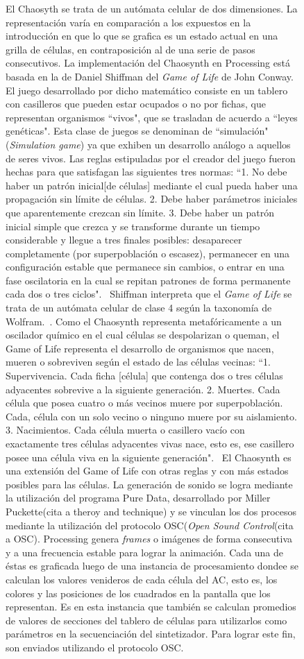 \documentclass[16pt,spanish]{article}
\begin{document}
\begin{figure}[h!]
	El Chaosyth se trata de un autómata celular de dos dimensiones. La representación varía en comparación a los expuestos en la introducción en que lo que se grafica es un estado actual en una grilla de células, en contraposición al de una serie de pasos consecutivos. La implementación del Chaosynth en Processing está basada en la de Daniel Shiffman del \textit{Game of Life} de John Conway. El juego desarrollado por dicho matemático consiste en un tablero con casilleros que pueden estar ocupados o no por fichas, que representan organismos ``vivos", que se trasladan de acuerdo a ``leyes genéticas". Esta clase de juegos se denominan de  ``simulación"(\textit{Simulation game}) ya que exhiben un desarrollo análogo a aquellos de seres vivos. Las reglas estipuladas por el creador del juego fueron hechas para que satisfagan las siguientes tres normas: ``1. No debe haber un patrón inicial[de células] mediante el cual pueda haber una propagación sin límite de células. 2. Debe haber parámetros iniciales que aparentemente crezcan sin límite. 3. Debe haber un patrón inicial simple que crezca y se transforme durante un tiempo considerable y llegue a tres finales posibles: desaparecer completamente (por superpoblación o escasez), permanecer en una configuración estable que permanece sin cambios, o entrar en una fase oscilatoria en la cual se repitan patrones de forma permanente cada dos o tres ciclos".~\cite{gardner1971mathematical} Shiffman interpreta que el \textit{Game of Life} se trata de un autómata celular de clase 4 según la taxonomía de Wolfram.~\cite{shiffman2012nature}. Como el Chaosynth representa metafóricamente a un oscilador químico en el cual células se despolarizan o queman, el Game of Life representa el desarrollo de organismos que nacen, mueren o sobreviven según el estado de las células vecinas: ``1. Supervivencia. Cada ficha [célula] que contenga dos o tres células adyacentes sobrevive a la siguiente generación. 2. Muertes. Cada célula que posea cuatro o más vecinos muere por superpoblación. Cada, célula con un solo vecino o ninguno muere por su aislamiento. 3. Nacimientos. Cada célula muerta o casillero vacío con exactamente tres células adyacentes vivas nace, esto es, ese casillero posee una célula viva en la siguiente generación".~\cite{gardner1971mathematical} El Chaosynth es una extensión del Game of Life con otras reglas y con más estados posibles para las células.
	La generación de sonido se logra mediante la utilización del programa Pure Data, desarrollado por Miller Puckette(cita a theroy and technique) y se vinculan los dos procesos mediante la utilización del protocolo OSC(\textit{Open Sound Control}(cita a OSC). Processing genera \textit{frames} o imágenes de forma consecutiva y a una frecuencia estable para lograr la animación. Cada una de éstas es graficada luego de una instancia de procesamiento dondee se calculan los valores venideros de cada célula del AC, esto es, los colores y las posiciones de los cuadrados en la pantalla que los representan. Es en esta instancia que también se calculan promedios de valores de secciones del tablero de células para utilizarlos como parámetros en la secuenciación del sintetizador. Para lograr este fin, son enviados utilizando el protocolo OSC.


\end{figure}
\end{document}
